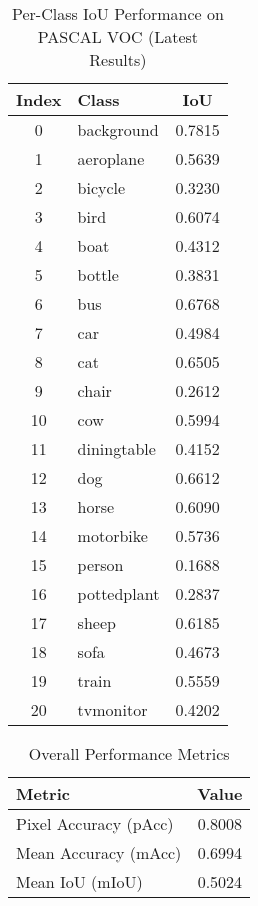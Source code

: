 \begin{table}[ht]
\centering
\caption{Per-Class IoU Performance on PASCAL VOC (Latest Results)}
\begin{tabular}{|c|l|c|}
\hline
\textbf{Index} & \textbf{Class}      & \textbf{IoU} \\ \hline
0  & background   & 0.7815  \\
1  & aeroplane    & 0.5639  \\
2  & bicycle      & 0.3230  \\
3  & bird         & 0.6074  \\
4  & boat         & 0.4312  \\
5  & bottle       & 0.3831  \\
6  & bus          & 0.6768  \\
7  & car          & 0.4984  \\
8  & cat          & 0.6505  \\
9  & chair        & 0.2612  \\
10 & cow          & 0.5994  \\
11 & diningtable  & 0.4152  \\
12 & dog          & 0.6612  \\
13 & horse        & 0.6090  \\
14 & motorbike    & 0.5736  \\
15 & person       & 0.1688  \\
16 & pottedplant  & 0.2837  \\
17 & sheep        & 0.6185  \\
18 & sofa         & 0.4673  \\
19 & train        & 0.5559  \\
20 & tvmonitor    & 0.4202  \\ \hline
\end{tabular}
\end{table}

\begin{table}[ht]
\centering
\caption{Overall Performance Metrics}
\begin{tabular}{|l|c|}
\hline
\textbf{Metric} & \textbf{Value} \\ \hline
Pixel Accuracy (pAcc) & 0.8008 \\
Mean Accuracy (mAcc)  & 0.6994 \\
Mean IoU (mIoU)       & 0.5024 \\ \hline
\end{tabular}
\end{table}

